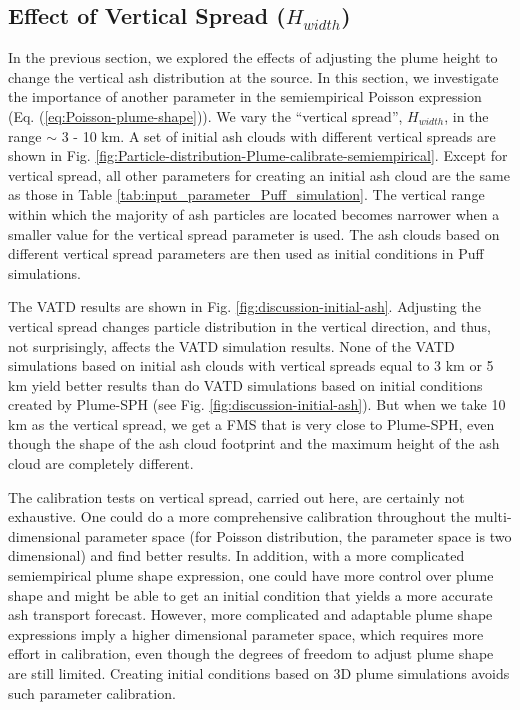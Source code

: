 \documentclass[utf8]{frontiersSCNS} %
\begin{document}
\subsection{Effect of Vertical Spread ($H_{width}$)}
In the previous section, we explored the effects of adjusting the plume height to change the vertical ash distribution at the source. In this section, we investigate the importance of another parameter in the semiempirical Poisson expression (Eq. (\ref{eq:Poisson-plume-shape})). We vary the ``vertical spread'', $H_{width}$, in the range $\sim$ 3 - 10 km. A set of initial ash clouds  with different vertical spreads are shown in Fig. \ref{fig:Particle-distribution-Plume-calibrate-semiempirical}. Except for vertical spread, all other parameters for creating an initial ash cloud are the same as those in Table \ref{tab:input_parameter_Puff_simulation}. The vertical range within which the majority of ash particles are located becomes narrower when a smaller value for the vertical spread parameter is used. The ash clouds based on different vertical spread parameters are then used as initial conditions in Puff simulations.

The VATD results are shown in Fig. \ref{fig:discussion-initial-ash}. Adjusting the vertical spread changes particle distribution in the vertical direction, and thus, not surprisingly, affects the VATD simulation results. None of the VATD simulations based on initial ash clouds with vertical spreads equal to 3 km or 5 km yield better results than do VATD simulations based on initial conditions created by Plume-SPH (see Fig. \ref{fig:discussion-initial-ash}). But when we take 10 km as the vertical spread, we get a FMS that is very close to Plume-SPH, even though the shape of the ash cloud footprint and the maximum height of the ash cloud are completely different.

The calibration tests on vertical spread, carried out here, are certainly not exhaustive. One could do a more comprehensive calibration throughout the multi-dimensional parameter space (for Poisson distribution, the parameter space is two dimensional) and find better results. In addition, with a more complicated semiempirical plume shape expression, one could have more control over plume shape and might be able to get an initial condition that yields a more accurate ash transport forecast. However, more complicated and adaptable plume shape expressions imply a higher dimensional parameter space, which requires more effort in calibration, even though the degrees of freedom to adjust plume shape are still limited.  Creating initial conditions based on 3D plume simulations avoids such parameter calibration.
\end{document}
